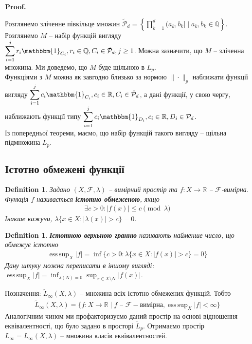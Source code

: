 \documentclass[a4paper, 10pt]{article}
\makeatletter
\theoremstyle{theoremdd}
\newtheorem{definition}[theorem]{Definition}
\DeclareMathOperator*{\esssup}{ess\,sup}
\renewenvironment{proof}[1][Proof.\\]{\par
\pushQED{\hfill \qed}%
\normalfont \topsep6\p@\@plus6\p@\relax
\trivlist
\item\relax
{\bfseries
#1\@addpunct{.}}\hspace\labelsep\ignorespaces
}{%
\popQED\endtrivlist\@endpefalse
}
\makeatother
\begin{document}
\begin{proof}
Розглянемо зліченне півкільце множин $\displaystyle \tilde{\mathcal{P}}_d = \left\{ \prod_{k=1}^d (a_k,b_k] \mid a_k,b_k \in \mathbb{Q} \right\}$. Розглянемо $M$ -- набір функцій вигляду $\displaystyle\sum_{i=1}^j r_i \mathbbm{1}_{C_i}, r_i \in \mathbb{Q}, C_i \in \tilde{\mathcal{P}}_d, j \geq 1$. Можна зазначити, що $M$ -- зліченна множина. Ми доведемо, що $M$ буде щільною в $L_p$.\\
Функціями з $M$ можна як завгодно близько за нормою $\| \cdot \|_p$ наближати функції вигляду $\displaystyle\sum_{i=1}^j c_i \mathbbm{1}_{C_i}, c_i \in \mathbb{R}, C_i \in \tilde{\mathcal{P}}_d$, а дані функції, у свою чергу, наближають функції типу $\displaystyle\sum_{i=1}^j c_i \mathbbm{1}_{D_i}, c_i \in \mathbb{R}, D_i \in \mathcal{P}_d$.\\
Із попередньої теореми, маємо, що набір функцій такого вигляду -- щільна підмножина $L_p$.
\end{proof}

\subsection{Істотно обмежені функції}
\begin{definition}
Задано $(X,\mathcal{F},\lambda)$ -- вимірний простір та $f \colon X \to \mathbb{R}$ -- $\mathcal{F}$-вимірна.\\
Функція $f$ називається \textbf{істотно обмеженою}, якщо
\begin{align*}
\exists c > 0: |f(x)| \leq c \pmod \lambda
\end{align*}
Інакше кажучи, $\lambda\{x \in X: |\lambda(x)| > c\} = 0$.
\end{definition}

\begin{definition}
\textbf{Істотною верхьною гранню} називають найменше число, що обмежує істотно
\begin{align*}
\esssup_X |f| = \inf \{c > 0: \lambda\{x \in X: |f(x)| > c\} = 0 \}
\end{align*}
Дану штуку можна переписати в іншому вигляді: $\displaystyle\esssup_X |f| = \inf_{\lambda(N) = 0} \sup_{x \in X \setminus N} |f(x)|$.
\end{definition}
\noindent Позначення: $\tilde{L}_\infty(X,\lambda)$ -- множина всіх істотно обмежених функцій. Тобто
\begin{align*}
\tilde{L}_\infty(X,\lambda) = \{f \colon X \to \mathbb{R} \mid f \text{ -- } \mathcal{F}-\text{вимірна}, \esssup_X |f| < \infty\}
\end{align*}
Аналогічним чином ми профакторизуємо даний простір на основі відношення еквівалентності, що було задано в просторі $\tilde{L}_p$. Отримаємо простір $L_\infty = L_\infty(X,\lambda)$ -- множина класів еквівалентностей.
\end{document}
